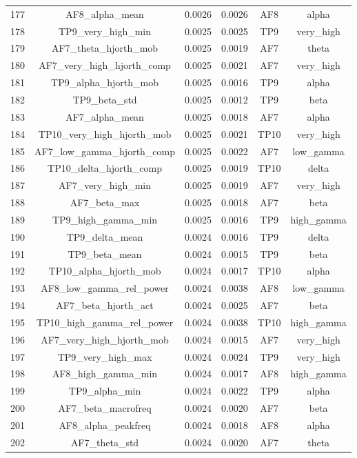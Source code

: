 \begin{table}[hptb]
\begin{table}
\begin{tabular}{cccccc}
177 & AF8_alpha_mean & 0.0026 & 0.0026 & AF8 & alpha \\
178 & TP9_very_high_min & 0.0025 & 0.0025 & TP9 & very_high \\
179 & AF7_theta_hjorth_mob & 0.0025 & 0.0019 & AF7 & theta \\
180 & AF7_very_high_hjorth_comp & 0.0025 & 0.0021 & AF7 & very_high \\
181 & TP9_alpha_hjorth_mob & 0.0025 & 0.0016 & TP9 & alpha \\
182 & TP9_beta_std & 0.0025 & 0.0012 & TP9 & beta \\
183 & AF7_alpha_mean & 0.0025 & 0.0018 & AF7 & alpha \\
184 & TP10_very_high_hjorth_mob & 0.0025 & 0.0021 & TP10 & very_high \\
185 & AF7_low_gamma_hjorth_comp & 0.0025 & 0.0022 & AF7 & low_gamma \\
186 & TP10_delta_hjorth_comp & 0.0025 & 0.0019 & TP10 & delta \\
187 & AF7_very_high_min & 0.0025 & 0.0019 & AF7 & very_high \\
188 & AF7_beta_max & 0.0025 & 0.0018 & AF7 & beta \\
189 & TP9_high_gamma_min & 0.0025 & 0.0016 & TP9 & high_gamma \\
190 & TP9_delta_mean & 0.0024 & 0.0016 & TP9 & delta \\
191 & TP9_beta_mean & 0.0024 & 0.0015 & TP9 & beta \\
192 & TP10_alpha_hjorth_mob & 0.0024 & 0.0017 & TP10 & alpha \\
193 & AF8_low_gamma_rel_power & 0.0024 & 0.0038 & AF8 & low_gamma \\
194 & AF7_beta_hjorth_act & 0.0024 & 0.0025 & AF7 & beta \\
195 & TP10_high_gamma_rel_power & 0.0024 & 0.0038 & TP10 & high_gamma \\
196 & AF7_very_high_hjorth_mob & 0.0024 & 0.0015 & AF7 & very_high \\
197 & TP9_very_high_max & 0.0024 & 0.0024 & TP9 & very_high \\
198 & AF8_high_gamma_min & 0.0024 & 0.0017 & AF8 & high_gamma \\
199 & TP9_alpha_min & 0.0024 & 0.0022 & TP9 & alpha \\
200 & AF7_beta_macrofreq & 0.0024 & 0.0020 & AF7 & beta \\
201 & AF8_alpha_peakfreq & 0.0024 & 0.0018 & AF8 & alpha \\
202 & AF7_theta_std & 0.0024 & 0.0020 & AF7 & theta \\

\end{tabular}
\end{table}
\end{table}
